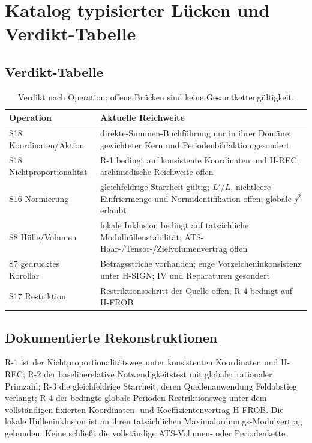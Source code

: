 \documentclass[11pt,a4paper]{article}
\theoremstyle{definition}
\theoremstyle{remark}
\begin{document}
\section{Katalog typisierter Lücken und Verdikt-Tabelle}\label{sec:catalogue}

\subsection{Verdikt-Tabelle}

\begin{table}[htbp]\centering\small
\caption{Verdikt nach Operation; offene Brücken sind keine Gesamtkettengültigkeit.}
\label{tab:verdict}
\begin{tabularx}{\textwidth}{@{}>{\raggedright\arraybackslash}p{} >{\raggedright\arraybackslash}X@{}}
\toprule Operation & Aktuelle Reichweite \\\midrule
S18 Koordinaten/Aktion & direkte-Summen-Buchführung nur in ihrer Domäne; gewichteter Kern und Periodenbildaktion gesondert \\
S18 Nichtproportionalität & R-1 bedingt auf konsistente Koordinaten und H-REC; archimedische Reichweite offen \\
S16 Normierung & gleichfeldrige Starrheit gültig; $L'/L$, nichtleere Einfrier\-menge und Normidentifikation offen; globale $j^2$ erlaubt \\
S8 Hülle/Volumen & lokale Inklusion bedingt auf tatsächliche Modulhüllenstabilität; ATS-Haar-/Tensor-/Zielvolumenvertrag offen \\
S7 gedrucktes Korollar & Betragsstriche vorhanden; enge Vorzeicheninkonsistenz unter H-SIGN; IV und Reparaturen gesondert \\
S17 Restriktion & Restriktionsschritt der Quelle offen; R-4 bedingt auf H-FROB \\
\bottomrule\end{tabularx}\end{table}

\subsection{Dokumentierte Rekonstruktionen}

R-1 ist der Nicht\-pro\-por\-tio\-na\-li\-täts\-weg unter konsistenten Koordinaten und
H-REC; R-2 der baseline\-relative Notwendigkeitstest mit globaler rationaler
Primzahl; R-3 die gleichfeldrige Starrheit, deren Quellenanwendung
Feldabstieg verlangt; R-4 der bedingte globale Perioden-Restriktionsweg
unter dem vollständigen fixierten Koordinaten- und Koeffizientenvertrag
H-FROB. Die lokale Hülleninklusion ist an ihren tatsächlichen
Maximal\-ordnungs-Modul\-vertrag gebunden. Keine schließt die vollständige
ATS-Volumen- oder Periodenkette.
\end{document}
